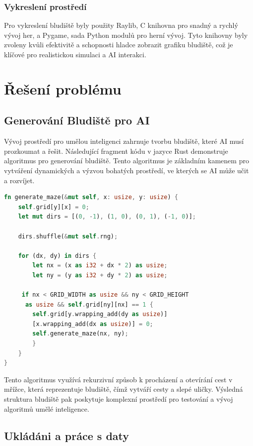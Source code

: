 \documentclass[12pt, a4paper,
twoside,        %
openright
]{report}
\begin{document}
\subsection{Vykreslení prostředí}
Pro vykreslení bludiště byly použity Raylib, C knihovna pro snadný a rychlý vývoj her, a Pygame, sada Python modulů pro herní vývoj. Tyto knihovny byly zvoleny kvůli efektivitě a schopnosti hladce zobrazit grafiku bludiště, což je klíčové pro realistickou simulaci a AI interakci.


\chapter{Řešení problému}

\section{Generování Bludiště pro AI}

Vývoj prostředí pro umělou inteligenci zahrnuje tvorbu bludiště, které AI musí prozkoumat a řešit. Následující fragment kódu v jazyce Rust demonstruje algoritmus pro generování bludiště. Tento algoritmus je základním kamenem pro vytváření dynamických a výzvou bohatých prostředí, ve kterých se AI může učit a rozvíjet.

\begin{lstlisting}[language=rust, caption={Funkce pro generování bludiště v Rustu}]
fn generate_maze(&mut self, x: usize, y: usize) {
	self.grid[y][x] = 0;
	let mut dirs = [(0, -1), (1, 0), (0, 1), (-1, 0)];
		
	dirs.shuffle(&mut self.rng);
		
	for (dx, dy) in dirs {
		let nx = (x as i32 + dx * 2) as usize;
		let ny = (y as i32 + dy * 2) as usize;
			
	 if nx < GRID_WIDTH as usize && ny < GRID_HEIGHT
	  as usize && self.grid[ny][nx] == 1 {
		self.grid[y.wrapping_add(dy as usize)]
		[x.wrapping_add(dx as usize)] = 0;
		self.generate_maze(nx, ny);
		}
	}
}
\end{lstlisting}


Tento algoritmus využívá rekurzivní způsob k procházení a otevírání cest v mřížce, která reprezentuje bludiště, čímž vytváří cesty a slepé uličky. Výsledná struktura bludiště pak poskytuje komplexní prostředí pro testování a vývoj algoritmů umělé inteligence.


\section{Ukládáni a práce s daty}
\end{document}
